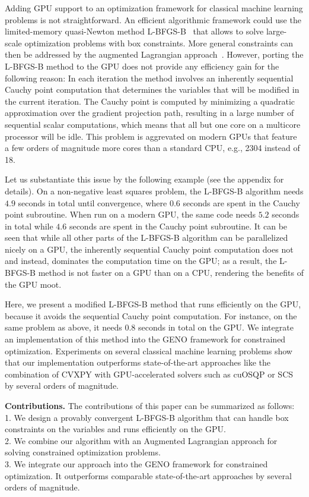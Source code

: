 \documentclass[letterpaper]{article} %
\begin{document}
Adding GPU support to an optimization framework for classical machine learning problems is not straightforward. An efficient algorithmic framework could use the limited-memory quasi-Newton method L-BFGS-B~\cite{ByrdLNZ95} that allows to solve large-scale optimization problems with box constraints. More general constraints can then be addressed by the augmented Lagrangian approach~\cite{Hestenes69,Powell69}. However, porting the L-BFGS-B method to the GPU does not provide any efficiency gain for the following reason: In each iteration the method involves an inherently sequential Cauchy point computation that determines the variables that will be modified in the current iteration. The Cauchy point is computed by minimizing a quadratic approximation over the gradient projection path, resulting in a large number of sequential scalar computations, which means that all but one core on a multicore processor will be idle. This problem is aggrevated on modern GPUs that feature a few orders of magnitude  more cores than a standard CPU, e.g., 2304 instead of 18.

Let us substantiate this issue by the following example (see the appendix for details). On a non-negative least squares problem, the  \mbox{L-BFGS-B} algorithm needs $4.9$ seconds in total until convergence, where $0.6$ seconds are spent in the Cauchy point subroutine. When run on a modern GPU, the same code needs $5.2$ seconds in total while $4.6$ seconds are spent in the Cauchy point subroutine. It can be seen that while all other parts of the L-BFGS-B algorithm can be parallelized nicely on a GPU, the inherently sequential Cauchy point computation does not and instead, dominates the computation time on the GPU; as a result, the \mbox{L-BFGS-B} method is not faster on a GPU than on a CPU, rendering the benefits of the GPU moot.

Here, we present a modified \mbox{L-BFGS-B} method that runs efficiently on the GPU, because it avoids the sequential Cauchy point computation. For instance, on the same problem as above, it needs $0.8$ seconds in total on the GPU.
We integrate an implementation of this method into the GENO framework for constrained optimization. Experiments on several classical machine learning problems show that our implementation outperforms state-of-the-art approaches like the combination of CVXPY with GPU-accelerated solvers such as cuOSQP or SCS by several orders of magnitude.

\textbf{Contributions.}
The contributions of this paper can be summarized as follows:\\
1. We design a provably convergent L-BFGS-B algorithm that can handle box constraints on the variables and runs efficiently on the GPU. \\
2. We combine our algorithm with an Augmented Lagrangian approach for solving constrained optimization problems. \\
3. We integrate our approach %
into the GENO framework for constrained optimization.
It outperforms comparable state-of-the-art approaches by several orders of magnitude.
\end{document}
